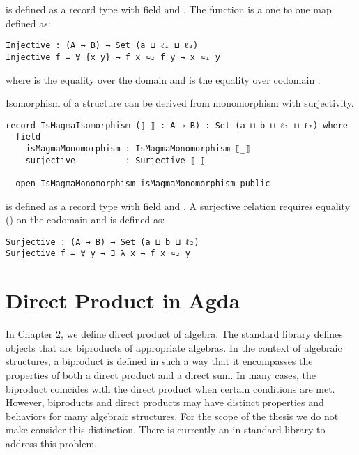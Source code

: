  is defined as a record type with field
 and . The 
function is a one to one map defined as:

\begin{verbatim}
Injective : (A → B) → Set (a ⊔ ℓ₁ ⊔ ℓ₂)
Injective f = ∀ {x y} → f x ≈₂ f y → x ≈₁ y
\end{verbatim}

where  is the equality over the domain  and 
is the equality over codomain .

Isomorphism of a structure can be derived from monomorphism with surjectivity.

\begin{verbatim}
record IsMagmaIsomorphism (⟦_⟧ : A → B) : Set (a ⊔ b ⊔ ℓ₁ ⊔ ℓ₂) where
  field
    isMagmaMonomorphism : IsMagmaMonomorphism ⟦_⟧
    surjective          : Surjective ⟦_⟧

  open IsMagmaMonomorphism isMagmaMonomorphism public
\end{verbatim} 

 is defined as a record type with field
 and . A surjective relation
requires equality () on the codomain  and is defined as:

\begin{verbatim}
Surjective : (A → B) → Set (a ⊔ b ⊔ ℓ₂)
Surjective f = ∀ y → ∃ λ x → f x ≈₂ y
\end{verbatim}

\section{Direct Product in Agda}
In Chapter 2, we define direct product of algebra. The standard library defines
objects that are biproducts of appropriate algebras. In the context of algebraic
structures, a biproduct is defined in such a way that it encompasses the
properties of both a direct product and a direct sum. In many cases, the
biproduct coincides with the direct product when certain conditions are met.
However, biproducts and direct products may have distinct properties and
behaviors for many algebraic structures. For the scope of the thesis we do not
make consider this distinction. There is currently an
 in standard
library to address this problem. 


